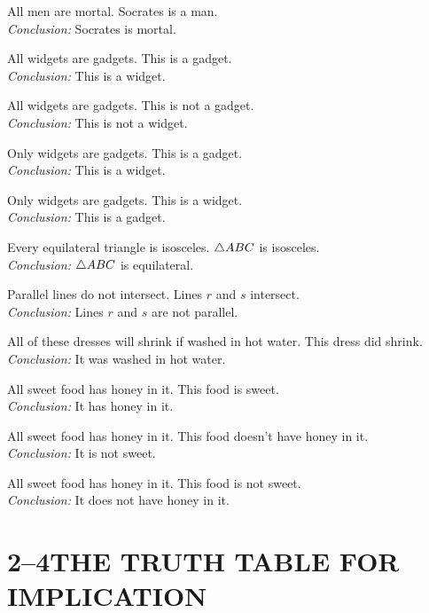 \documentclass[11pt]{book}
\begin{document}
\begin{exercisecols}
\begin{exlist}\setcounter{exlisti}{7}
\item All men are mortal. Socrates is a man.\\
      \emph{Conclusion:} Socrates is mortal.
\item All widgets are gadgets. This is a gadget.\\
      \emph{Conclusion:} This is a widget.
\item All widgets are gadgets. This is not a gadget.\\
      \emph{Conclusion:} This is not a widget.
\item Only widgets are gadgets. This is a gadget.\\
      \emph{Conclusion:} This is a widget.
\item Only widgets are gadgets. This is a widget.\\
      \emph{Conclusion:} This is a gadget.
\item Every equilateral triangle is isosceles. $\triangle ABC$ is isosceles.\\
      \emph{Conclusion:} $\triangle ABC$ is equilateral.
\item Parallel lines do not intersect. Lines $r$ and $s$ intersect.\\
      \emph{Conclusion:} Lines $r$ and $s$ are not parallel.
\item All of these dresses will shrink if washed in hot water. This dress did
      shrink.\\
      \emph{Conclusion:} It was washed in hot water.
\item All sweet food has honey in it. This food is sweet.\\
      \emph{Conclusion:} It has honey in it.
\item All sweet food has honey in it. This food doesn't have honey in it.\\
      \emph{Conclusion:} It is not sweet.
\item All sweet food has honey in it. This food is not sweet.\\
      \emph{Conclusion:} It does not have honey in it.
\end{exlist}
\end{exercisecols}

\section*{2--4\quad THE TRUTH TABLE FOR IMPLICATION}
\end{document}

